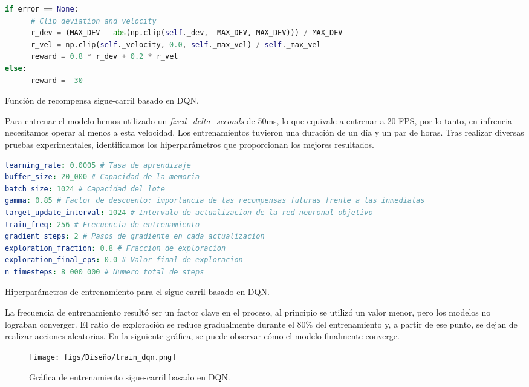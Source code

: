 \begin{code}[h]
\begin{lstlisting}[language=Python]
if error == None:
      # Clip deviation and velocity
      r_dev = (MAX_DEV - abs(np.clip(self._dev, -MAX_DEV, MAX_DEV))) / MAX_DEV
      r_vel = np.clip(self._velocity, 0.0, self._max_vel) / self._max_vel
      reward = 0.8 * r_dev + 0.2 * r_vel
else:
      reward = -30
\end{lstlisting}
\caption[Función de recompensa sigue-carril basado en \ac{DQN}]{Función de recompensa sigue-carril basado en \ac{DQN}.}
\label{cod:rew_dqn}
\end{code}

Para entrenar el modelo hemos utilizado un \textit{fixed\_delta\_seconds} de 50ms, lo que equivale a entrenar a 20 FPS, por lo tanto, en infrencia necesitamos operar al menos a esta velocidad. Los entrenamientos tuvieron una duración de un día y un par de horas. Tras realizar diversas pruebas experimentales, identificamos los hiperparámetros que proporcionan los mejores resultados. 
\begin{code}[h]
\begin{lstlisting}[language=yaml]
learning_rate: 0.0005 # Tasa de aprendizaje
buffer_size: 20_000 # Capacidad de la memoria
batch_size: 1024 # Capacidad del lote
gamma: 0.85 # Factor de descuento: importancia de las recompensas futuras frente a las inmediatas
target_update_interval: 1024 # Intervalo de actualizacion de la red neuronal objetivo
train_freq: 256 # Frecuencia de entrenamiento
gradient_steps: 2 # Pasos de gradiente en cada actualizacion
exploration_fraction: 0.8 # Fraccion de exploracion
exploration_final_eps: 0.0 # Valor final de exploracion
n_timesteps: 8_000_000 # Numero total de steps

\end{lstlisting}
\caption[Hiperparámetros de entrenamiento para el sigue-carril basado en \ac{DQN}]{Hiperparámetros de entrenamiento para el sigue-carril basado en \ac{DQN}.}
\label{cod:hiper_params_dqn}
\end{code}

La frecuencia de entrenamiento resultó ser un factor clave en el proceso, al principio se utilizó un valor menor, pero los modelos no lograban converger. El ratio de exploración se reduce gradualmente durante el 80\% del entrenamiento y, a partir de ese punto, se dejan de realizar acciones aleatorias. En la siguiente gráfica, se puede observar cómo el modelo finalmente converge.
\begin{figure}[ht]
  \centering
  \texttt{[image: figs/Diseño/train\_dqn.png]}
  \caption{Gráfica de entrenamiento sigue-carril basado en \ac{DQN}.}
  \label{fig:train_dqn}
\end{figure}


